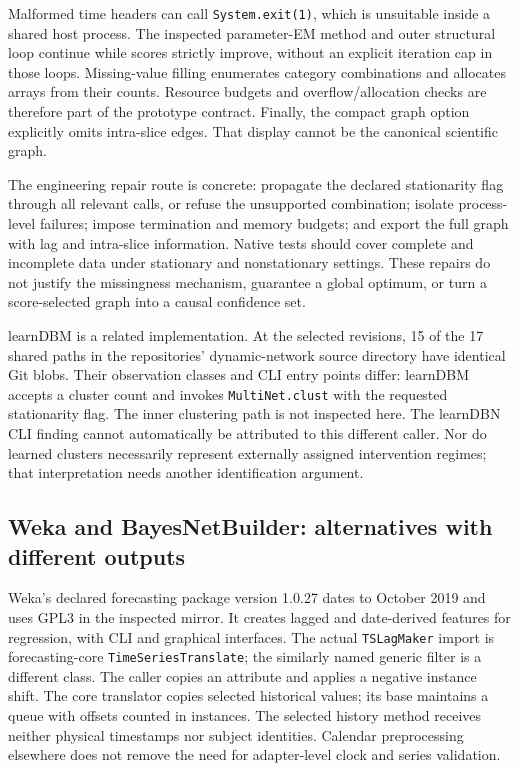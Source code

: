 Malformed time headers can call \texttt{System.exit(1)}, which is unsuitable
inside a shared host process. The inspected parameter-EM method and outer
structural loop continue while scores strictly improve, without an explicit
iteration cap in those loops. Missing-value filling enumerates category
combinations and allocates arrays from their counts. Resource budgets and
overflow/allocation checks are therefore part of the prototype contract.
Finally, the compact graph option explicitly omits intra-slice edges. That
display cannot be the canonical scientific graph.~\citep{exec15_javatemporal_learndbn}

The engineering repair route is concrete: propagate the declared stationarity
flag through all relevant calls, or refuse the unsupported combination;
isolate process-level failures; impose termination and memory budgets; and
export the full graph with lag and intra-slice information. Native tests
should cover complete and incomplete data under stationary and nonstationary
settings. These repairs do not justify the missingness mechanism, guarantee
a global optimum, or turn a score-selected graph into a causal confidence
set.~\citep{exec15_javatemporal_design}

learnDBM is a related implementation. At the selected revisions, 15 of the
17 shared paths in the repositories' dynamic-network source directory have
identical Git blobs. Their observation classes and CLI entry points differ:
learnDBM accepts a cluster count and invokes \texttt{MultiNet.clust} with the
requested stationarity flag. The inner clustering path is not inspected here.
The learnDBN CLI finding cannot automatically be attributed to this different
caller. Nor do learned clusters necessarily represent externally assigned
intervention regimes; that interpretation needs another identification
argument.~\citep{exec15_javatemporal_learndbn,exec15_javatemporal_learndbm}

\subsection{Weka and BayesNetBuilder: alternatives with different outputs}

Weka's declared forecasting package version 1.0.27 dates to October 2019 and
uses GPL3 in the inspected mirror. It creates lagged and date-derived features
for regression, with CLI and graphical interfaces. The actual
\texttt{TSLagMaker} import is forecasting-core \texttt{TimeSeriesTranslate};
the similarly named generic filter is a different class. The caller copies an
attribute and applies a negative instance shift. The core translator copies
selected historical values; its base maintains a queue with offsets counted
in instances. The selected history method receives neither physical
timestamps nor subject identities. Calendar preprocessing elsewhere does not
remove the need for adapter-level clock and series validation.
\citep{exec15_javatemporal_weka}

